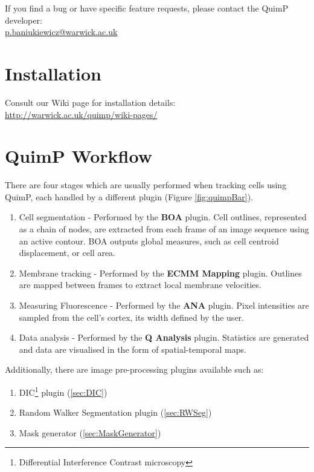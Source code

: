 \documentclass[a4paper,12pt]{article}
\begin{document}
If you find a bug or have specific feature requests, please contact the QuimP developer:\\ \href{mailto:p.baniukiewicz@warwick.ac.uk}{p.baniukiewicz@warwick.ac.uk}

\section{Installation}

Consult our Wiki page for installation details:\\ \url{http://warwick.ac.uk/quimp/wiki-pages/}

\section{QuimP Workflow}

There are four stages which are usually performed when tracking cells using QuimP, each handled by a different plugin (Figure \ref{fig:quimpBar}).

\begin{enumerate}
	\item Cell segmentation - Performed by the \textbf{BOA} plugin.  Cell outlines, represented as a chain of nodes, are extracted from each frame of an image sequence using an active contour. BOA outputs global measures, such as cell centroid displacement, or cell area.
	\item Membrane tracking - Performed by the \textbf{ECMM Mapping} plugin.  Outlines are mapped between frames to extract local membrane velocities.
	\item Measuring Fluorescence - Performed by the \textbf{ANA} plugin.  Pixel intensities are sampled from the cell's cortex, its width defined by the user.
	\item Data analysis - Performed by the \textbf{Q Analysis} plugin. Statistics are generated and data are visualised in the form of spatial-temporal maps.
\end{enumerate}

Additionally, there are image pre-processing plugins available such as:

\begin{enumerate}
	\item DIC\footnote{Differential Interference Contrast microscopy} plugin (\autoref{sec:DIC})
	\item Random Walker Segmentation plugin (\autoref{sec:RWSeg})
	\item Mask generator (\autoref{sec:MaskGenerator})
\end{enumerate}
\end{document}
